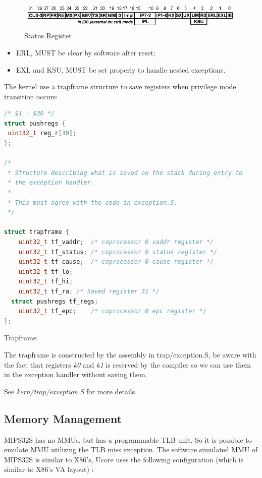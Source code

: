 \documentclass[a4paper]{article}
\begin{document}
\begin{figure}[h]
\centering
\includegraphics[width=0.8\linewidth]{reg-sr.png}
\caption{Status Register\cite{Sweetman:2006:SMR:1210986}}
\label{fig:reg-sr}
\end{figure}

\begin{itemize}
\item ERL, MUST be clear by software after reset;
\item EXL and KSU, MUST be set properly to handle nested exceptions.
\end{itemize}

The kernel use a trapframe structure to save registers when privilege mode transition occurs:
\begin{algorithm}[h]
   \begin{lstlisting}[language={C++}]
/* $1 - $30 */
struct pushregs {
 uint32_t reg_r[30];
};

/*
 * Structure describing what is saved on the stack during entry to
 * the exception handler.
 *
 * This must agree with the code in exception.S.
 */

struct trapframe {
	uint32_t tf_vaddr;	/* coprocessor 0 vaddr register */
	uint32_t tf_status;	/* coprocessor 0 status register */
	uint32_t tf_cause;	/* coprocessor 0 cause register */
	uint32_t tf_lo;
	uint32_t tf_hi;
	uint32_t tf_ra;	/* Saved register 31 */
  struct pushregs tf_regs;
	uint32_t tf_epc;	/* coprocessor 0 epc register */
};

\end{lstlisting}
\caption{Trapframe}
\end{algorithm}

The trapframe is constructed by the assembly in trap/exception.S, be aware with the fact that
registers \emph{k0} and \emph{k1} is reserved by the compiler so we can use them in the exception
handler without saving them.

See \emph{kern/trap/exception.S} for more details.

\subsection{Memory Management}
\label{sec:mm}
MIPS32S has no MMUs, but has a programmable TLB unit. So
it is possible to emulate MMU utilizing the TLB miss exception.
The software simulated MMU of MIPS32S is similar to X86's, 
Ucore uses the following 
configuration (which is similar to X86's VA layout) :
\end{document}

